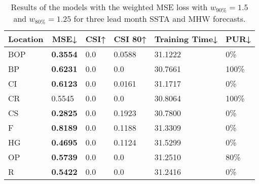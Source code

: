 \documentclass[11pt, a4paper]{article}
\begin{document}
\begin{table}[H]
\centering
\small
\caption{Results of the models with the weighted MSE loss with $w_{90\%}=1.5$ and $w_{80\%}=1.25$ for three lead month SSTA and MHW forecasts.}
\begin{tabular}{llllll}
\multicolumn{1}{c}{\textbf{Location}} & \multicolumn{1}{c}{\textbf{MSE↓}} & \multicolumn{1}{c}{\textbf{CSI↑}} & \multicolumn{1}{c}{\textbf{CSI 80↑}} & \multicolumn{1}{c}{\textbf{Training Time↓}} & \multicolumn{1}{c}{\textbf{PUR↓}} \\ \hline
BOP                         & \textbf{0.3554}                   & 0.0                               & 0.0588                               & 31.1222                            & 0\%                      \\
BP                        & \textbf{0.6231}                   & 0.0                               & 0.0                                  & 30.7661                            & 100\%                    \\
CI                        & \textbf{0.6123}                   & 0.0                               & 0.0161                               & 31.1717                            & 0\%                      \\
CR                           & 0.5545                            & 0.0                               & 0.0                                  & 30.8064                            & 100\%                    \\
CS                           & \textbf{0.2825}                   & 0.0                               & 0.1923                               & 30.7800                            & 0\%                      \\
F                             & \textbf{0.8189}                   & 0.0                               & 0.1188                               & 31.3309                            & 0\%                      \\
HG                          & \textbf{0.4695}                   & 0.0                               & 0.1124                               & 31.5299                            & 0\%                      \\
OP                       & \textbf{0.5739}                   & 0.0                               & 0.0                                  & 31.2510                            & 80\%                     \\
R                                & \textbf{0.5422}                   & 0.0                               & 0.0                                  & 31.2416                            & 0\%                      \\

\end{tabular}
\end{table}
\end{document}
